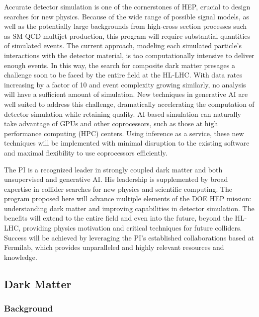 Accurate detector simulation is one of the cornerstones of HEP, crucial to design searches for new physics.
Because of the wide range of possible signal models,
as well as the potentially large backgrounds from high-cross section processes such as SM QCD multijet production,
this program will require substantial quantities of simulated events.
The current approach, modeling each simulated particle's interactions with the detector material, is too computationally intensive to deliver enough events.
In this way, the search for composite dark matter presages a challenge soon to be faced by the entire field at the HL-LHC.
With data rates increasing by a factor of 10 and event complexity growing similarly, no analysis will have a sufficient amount of simulation.
New techniques in generative AI are well suited to address this challenge, dramatically accelerating the computation of detector simulation while retaining quality.
AI-based simulation can naturally take advantage of GPUs and other coprocessors, such as those at high performance computing (HPC) centers.
Using inference as a service, these new techniques will be implemented with minimal disruption to the existing software and maximal flexibility to use coprocessors efficiently.

The PI is a recognized leader in strongly coupled dark matter and both unsupervised and generative AI.
His leadership is supplemented by broad expertise in collider searches for new physics and scientific computing.
The program proposed here will advance multiple elements of the DOE HEP mission: understanding dark matter and improving capabilities in detector simulation.
The benefits will extend to the entire field and even into the future, beyond the HL-LHC, providing physics motivation and critical techniques for future colliders.
Success will be achieved by leveraging the PI's established collaborations based at Fermilab, which provides unparalleled and highly relevant resources and knowledge.

\subsection{Dark Matter}\label{subsec:dm}

\subsubsection{Background}\label{subsec:dmbkg}

